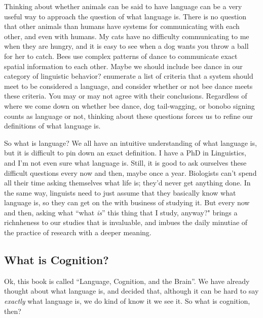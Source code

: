 \documentclass[
]{article}
\begin{document}
Thinking about whether animals can be said to have language can be a very useful way to approach the question of what language is. There is no question that other animals than humans have systems for communicating with each other, and even with humans. My cats have no difficulty communicating to me when they are hungry, and it is easy to see when a dog wants you throw a ball for her to catch. Bees use complex patterns of dance to communicate exact spatial information to each other. Maybe we should include bee dance in our category of linguistic behavior? \citet{hockett1960origin} enumerate a list of criteria that a system should meet to be considered a language, and consider whether or not bee dance meets these criteria. You may or may not agree with their conclusions. Regardless of where we come down on whether bee dance, dog tail-wagging, or bonobo signing counts as language or not, thinking about these questions forces us to refine our definitions of what language is.

So what is language? We all have an intuitive understanding of what language is, but it is difficult to pin down an exact definition. I have a PhD in Linguistics, and I'm not even sure what language is. Still, it is good to ask ourselves these difficult questions every now and then, maybe once a year. Biologists can't spend all their time asking themselves what life is; they'd never get anything done. In the same way, linguists need to just assume that they basically know what language is, so they can get on the with business of studying it. But every now and then, asking what ``what \emph{is}'' this thing that I study, anyway?" brings a richnheness to our studies that is invaluable, and imbues the daily minutiae of the practice of research with a deeper meaning.

\hypertarget{what-is-cognition}{%
\subsection{What is Cognition?}\label{what-is-cognition}}

Ok, this book is called ``Language, Cognition, and the Brain''. We have already thought about what language is, and decided that, although it can be hard to say \emph{exactly} what language is, we do kind of know it we see it. So what is cognition, then?
\end{document}
